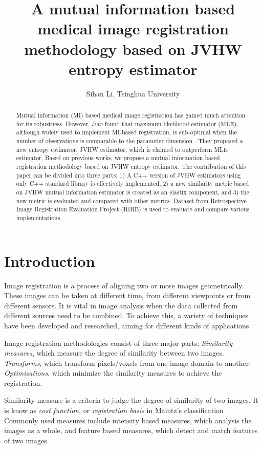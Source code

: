 \documentclass{IEEEtran}
\title{A mutual information based medical image registration methodology based on JVHW entropy estimator}
\author{Sihan Li, Tsinghua University}
\begin{document}
  \maketitle

  \begin{abstract}
    Mutual information (MI) based medical image registration has gained much attention for its robustness. However, Jiao found that maximum likelihood estimator (MLE), although widely used to implement MI-based registration, is sub-optimal when the number of observations is comparable to the parameter dimension \cite{jiao2015minimax}. They proposed a new entropy estimator, JVHW estimator, which is claimed to outperform MLE estimator. Based on previous works, we propose a mutual information based registration methodology based on JVHW entropy estimator. The contribution of this paper can be divided into three parts: 1) A C++ version of JVHW estimators using only C++ standard library is effectively implemented, 2) a new similarity metric based on JVHW mutual information estimator is created as an elastix component, and 3) the new metric is evaluated and compared with other metrics. Dataset from Retrospective Image Registration Evaluation Project (RIRE) is used to evaluate and compare various implementations.

  \end{abstract}

  \section{Introduction}

  Image registration is a process of aligning two or more images geometrically. These images can be taken at different time, from different viewpoints or from different sensors. It is vital in image analysis when the data collected from different sources need to be combined. To achieve this, a variety of techniques have been developed and researched, aiming for different kinds of applications. \cite{brown1992survey, zitova2003image}

  Image registration methodologies consist of three major parts: \emph{Similarity measures}, which measure the degree of similarity between two images. \emph{Transforms}, which transform pixels/voxels from one image domain to another. \emph{Optimizations}, which minimize the similarity measures to achieve the registration.

  Similarity measure is a criteria to judge the degree of similarity of two images. It is know as \emph{cost function}, or \emph{registration basis} in Maintz's classification \cite{maintz1998survey}. Commonly used measures include intensity based measures, which analysis the images as a whole, and feature based measures, which detect and match features of two images.
\end{document}
